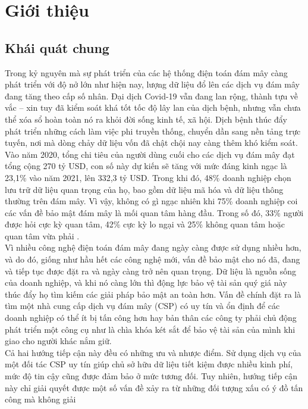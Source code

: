 \chapter{Giới thiệu}
\label{chap:chap1-introduce}
\section{Khái quát chung}

Trong kỷ nguyên mà sự phát triển của các hệ thống điện toán đám mây càng phát
triển với độ nở lớn như hiện nay, lượng dữ liệu đổ lên các dịch vụ đám mây đang tăng
theo cấp số nhân. Đại dịch Covid-19 vẫn đang lan rộng, thành tựu về vắc – xin tuy đã
kiểm soát khá tốt tốc độ lây lan của dịch bệnh, nhưng vẫn chưa thể xóa sổ hoàn toàn nó
ra khỏi đời sống kinh tế, xã hội. Dịch bệnh thúc đẩy phát triển những cách làm việc phi
truyền thống, chuyển dần sang nền tảng trực tuyến, nơi mà dòng chảy dữ liệu vốn đã
chật chội nay càng thêm khó kiểm soát. Vào năm 2020, tổng chi tiêu của người dùng
cuối cho các dịch vụ đám mây đạt tổng cộng 270 tỷ USD, con số này dự kiến sẽ tăng với
mức đáng kinh ngạc là 23,1\% vào năm 2021, lên 332,3 tỷ USD. Trong khi đó, 48\%
doanh nghiệp chọn lưu trữ dữ liệu quan trọng của họ, bao gồm dữ liệu mã hóa và dữ liệu
thông thường trên đám mây. Vì vậy, không có gì ngạc nhiên khi 75\% doanh nghiệp coi
các vấn đề bảo mật đám mây là mối quan tâm hàng đầu. Trong số đó, 33\% người được
hỏi cực kỳ quan tâm, 42\% cực kỳ lo ngại và 25\% không quan tâm hoặc quan tâm vừa
phải \cite{vladimir2021cloudcomputing}. \\
\indent Vì nhiều công nghệ điện toán đám mây đang ngày càng được sử dụng nhiều hơn,
và do đó, giống như hầu hết các công nghệ mới, vấn đề bảo mật cho nó đã, đang và tiếp
tục được đặt ra và ngày càng trở nên quan trọng. Dữ liệu là nguồn sống của doanh nghiệp,
và khi nó càng lớn thì động lực bảo vệ tài sản quý giá này thúc đẩy họ tìm kiếm các giải
pháp bảo mật an toàn hơn. Vấn đề chính đặt ra là tìm một nhà cung cấp dịch vụ đám mây
(CSP) có uy tín và ổn định để các doanh nghiệp có thể ít bị tấn công hơn hay bản thân
các công ty phải chủ động phát triển một công cụ như là chìa khóa két sắt để bảo vệ tài
sản của mình khi giao cho người khác nắm giữ. \\
\indent Cả hai hướng tiếp cận này đều có những ưu và nhược điểm. Sử dụng dịch vụ của
một đối tác CSP uy tín giúp chủ sở hữu dữ liệu tiết kiệm được nhiều kinh phí, mức độ
tin cậy cũng được đảm bảo ở mức tương đối. Tuy nhiên, hướng tiếp cận này chỉ giải quyết được một số vấn đề xảy ra từ những đối tượng xấu có ý đồ tấn công mà không giải
